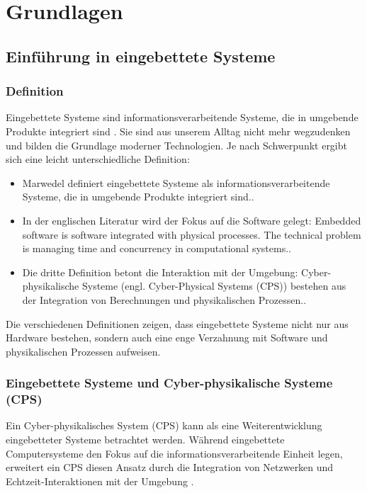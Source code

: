 \chapter{Grundlagen}
\section{Einführung in eingebettete Systeme}
\subsection{Definition}
Eingebettete Systeme sind informationsverarbeitende Systeme, die in umgebende Produkte integriert sind \cite {Marwedel.2021}. Sie sind aus unserem Alltag nicht mehr wegzudenken und bilden die Grundlage moderner Technologien. Je nach Schwerpunkt ergibt sich eine leicht unterschiedliche Definition:  
\begin{itemize}
    \item Marwedel definiert eingebettete Systeme als \glqq informationsverarbeitende Systeme, die in umgebende Produkte integriert sind.\grqq\cite{Marwedel.2021}.
    \item In der englischen Literatur wird der Fokus auf die Software gelegt: \glqq Embedded software is software integrated with physical processes. The technical problem is managing time and concurrency in computational systems.\grqq\cite{Marwedel.2021}.
    \item Die dritte Definition betont die Interaktion mit der Umgebung: \glqq Cyber-physikalische Systeme (engl. Cyber-Physical Systems (CPS)) bestehen aus der Integration von Berechnungen und physikalischen Prozessen.\grqq\cite{Marwedel.2021}.
\end{itemize}  

Die verschiedenen Definitionen zeigen, dass eingebettete Systeme nicht nur aus Hardware bestehen, sondern auch eine enge Verzahnung mit Software und physikalischen Prozessen aufweisen.  

\subsection{Eingebettete Systeme und Cyber-physikalische Systeme (CPS)}
Ein Cyber-physikalisches System (CPS) kann als eine Weiterentwicklung eingebetteter Systeme betrachtet werden. Während eingebettete Computersysteme den Fokus auf die informationsverarbeitende Einheit legen, erweitert ein CPS diesen Ansatz durch die Integration von Netzwerken und Echtzeit-Interaktionen mit der Umgebung \cite{Marwedel.2021}.  

